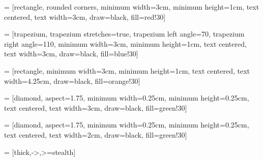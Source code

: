 
 = [rectangle, rounded corners,
minimum width=3cm,
minimum height=1cm,
text centered,
text width=3cm,
draw=black,
fill=red!30]

 = [trapezium,
trapezium stretches=true, %
trapezium left angle=70,
trapezium right angle=110,
minimum width=3cm,
minimum height=1cm,
text centered,
text width=3cm,
draw=black, fill=blue!30]

 = [rectangle,
minimum width=3cm,
minimum height=1cm,
text centered,
text width=4.25cm,
draw=black,
fill=orange!30]

 = [diamond,
aspect=1.75,
minimum width=0.25cm,
minimum height=0.25cm,
text centered,
text width=3cm,
draw=black,
fill=green!30]

 = [diamond,
aspect=1.75,
minimum width=0.25cm,
minimum height=0.25cm,
text centered,
text width=2cm,
draw=black,
fill=green!30]

 = [thick,->,>=stealth]

